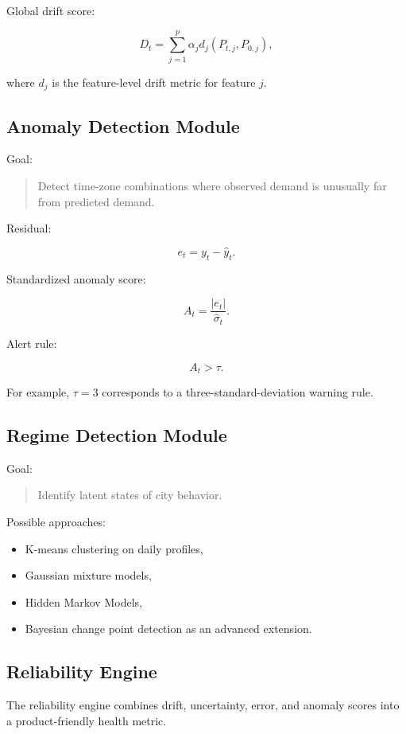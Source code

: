 \documentclass[11pt]{article}
\begin{document}
Global drift score:

\[
    D_t = \sum_{j=1}^p \alpha_j d_j(P_{t,j}, P_{0,j}),
\]

where $d_j$ is the feature-level drift metric for feature $j$.

\subsection{Anomaly Detection Module}

Goal:

\begin{quote}
    Detect time-zone combinations where observed demand is unusually far from predicted demand.
\end{quote}

Residual:

\[
    e_t = y_t - \hat{y}_t.
\]

Standardized anomaly score:

\[
    A_t = \frac{|e_t|}{\hat{\sigma}_t}.
\]

Alert rule:

\[
    A_t > \tau.
\]

For example, $\tau=3$ corresponds to a three-standard-deviation warning rule.

\subsection{Regime Detection Module}

Goal:

\begin{quote}
    Identify latent states of city behavior.
\end{quote}

Possible approaches:

\begin{itemize}
    \item K-means clustering on daily profiles,
    \item Gaussian mixture models,
    \item Hidden Markov Models,
    \item Bayesian change point detection as an advanced extension.
\end{itemize}

\subsection{Reliability Engine}

The reliability engine combines drift, uncertainty, error, and anomaly scores into a product-friendly health metric.
\end{document}
